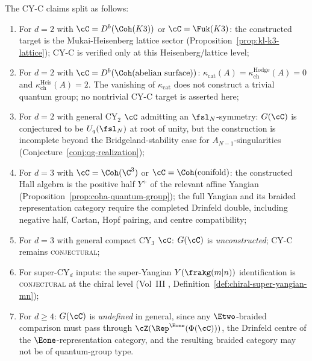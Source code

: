 \begin{conjecture}
\label{conj:cy-c-constructed-loci}
The CY-C claims split as follows:
\begin{enumerate}[label=(\roman*)]
 \item For $d = 2$ with $\cC = D^b(\Coh(K3))$ or $\cC = \Fuk(K3)$:
 the constructed target is the Mukai-Heisenberg lattice sector
 (Proposition~\ref{prop:kl-k3-lattice}); CY-C is verified only at this
 Heisenberg/lattice level;
 \item For $d = 2$ with $\cC = D^b(\Coh(\text{abelian surface}))$:
 $\kappa_{\mathrm{cat}}(A)=\kappa_{\mathrm{ch}}^{\mathrm{Hodge}}(A)=0$
 and $\kappa_{\mathrm{ch}}^{\mathrm{Heis}}(A)=2$. The vanishing of
 $\kappa_{\mathrm{cat}}$ does not construct a trivial quantum group;
 no nontrivial CY-C target is asserted here;
 \item For $d = 2$ with general CY$_2$ $\cC$ admitting an
 $\fsl_N$-symmetry: $G(\cC)$ is conjectured to be
 $U_q(\fsl_N)$ at root of unity, but the construction is
 incomplete beyond the Bridgeland-stability case for
 $A_{N-1}$-singularities (Conjecture~\ref{conj:qg-realization});
 \item For $d = 3$ with $\cC = \Coh(\C^3)$ or
 $\cC = \Coh(\text{conifold})$: the constructed Hall algebra is the
 positive half $Y^+$ of the relevant affine Yangian
 (Proposition~\ref{prop:coha-quantum-group}); the full Yangian and its
 braided representation category require the completed Drinfeld double,
 including negative half, Cartan, Hopf pairing, and centre compatibility;
 \item For $d = 3$ with general compact CY$_3$ $\cC$:
 $G(\cC)$ is \emph{unconstructed}; CY-C remains
 \textsc{conjectural};
 \item For super-CY$_d$ inputs: the super-Yangian
 $Y(\frakg(m|n))$ identification is \textsc{conjectural} at
 the chiral level
 (Vol~III \cite{VolI},
 Definition~\ref{def:chiral-super-yangian-mn});
 \item For $d \geq 4$: $G(\cC)$ is \emph{undefined} in general,
 since any $\Etwo$-braided comparison must pass through
 $\cZ(\Rep^{\Eone}(\Phi(\cC)))$, the Drinfeld centre
 of the $\Eone$-representation category, and the resulting braided
 category may not be of quantum-group type.
\end{enumerate}
\end{conjecture}

